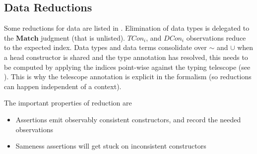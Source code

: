 \subsection{Data Reductions}

Some reductions for data are listed in .
Elimination of data types is delegated to the $\mathbf{Match}$ judgment (that is unlisted). 
$TCon_{i}$, and $DCon_{i}$ observations reduce to the expected index.
Data types and data terms consolidate over $\sim$ and $\cup$ when a head constructor is shared and the type annotation has resolved, this needs to be computed by applying the indices point-wise against the typing telescope (see ).
This is why the telescope annotation is explicit in the formalism (so reductions can happen independent of a context). 

The important properties of reduction are 
\begin{itemize}
\item Assertions emit observably consistent constructors, and record the needed observations
\item Sameness assertions will get stuck on inconsistent constructors
\end{itemize}

